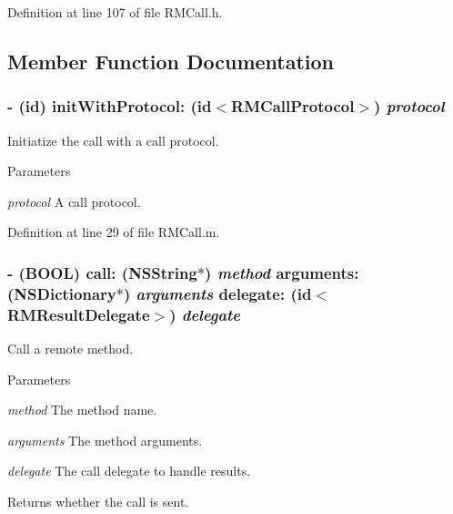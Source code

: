 Definition at line 107 of file RMCall.h.

\subsection{Member Function Documentation}
\hypertarget{interface_r_m_call_a64f1e76758d2d473859064c5b0c6c75d}{
\subsubsection[{initWithProtocol:}]{\setlength{\rightskip}{0pt plus 5cm}-\/ (id) initWithProtocol: (id$<${\bf RMCallProtocol}$>$) {\em protocol}}}
\label{interface_r_m_call_a64f1e76758d2d473859064c5b0c6c75d}


Initiatize the call with a call protocol. 
\begin{DoxyParams}{Parameters}
\item[{\em protocol}]A call protocol. \end{DoxyParams}


Definition at line 29 of file RMCall.m.\hypertarget{interface_r_m_call_a85bb3ac47600a313105a6f94c9ab7ec3}{
\subsubsection[{call:arguments:delegate:}]{\setlength{\rightskip}{0pt plus 5cm}-\/ (BOOL) call: ({\bf NSString}$\ast$) {\em method}\/ arguments: (NSDictionary$\ast$) {\em arguments}\/ delegate: (id$<${\bf RMResultDelegate}$>$) {\em delegate}}}
\label{interface_r_m_call_a85bb3ac47600a313105a6f94c9ab7ec3}


Call a remote method. 
\begin{DoxyParams}{Parameters}
\item[{\em method}]The method name. \item[{\em arguments}]The method arguments. \item[{\em delegate}]The call delegate to handle results.\end{DoxyParams}
\begin{DoxyReturn}{Returns}
whether the call is sent. 
\end{DoxyReturn}


